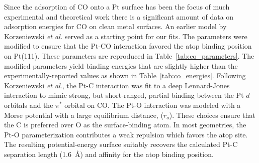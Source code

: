 Since the adsorption of CO onto a Pt surface has been the focus
of much experimental \citep{Yeo:1997th, Hopster:1978yf, Ertl:1977cg, Kelemen:1979ad}
and theoretical work
\citep{Beurden:2002ys, Korzeniewski:1986kl, Deshlahra:2009wu, Feibelman:2001qa, Mason:2004ix}
there is a significant amount of data on adsorption energies for CO on
clean metal surfaces. An earlier model by Korzeniewski {\it et
  al.}\citep{Korzeniewski:1986kl} served as a starting point for our fits. The parameters were
modified to ensure that the Pt-CO interaction favored the atop binding
position on Pt(111). These parameters are reproduced in Table~\ref{tab:co_parameters}.
The modified parameters yield binding energies that are slightly higher
than the experimentally-reported values as shown in Table~\ref{tab:co_energies}. Following Korzeniewski
{\it et al}.,\citep{Korzeniewski:1986kl} the Pt-C interaction was fit to a deep
Lennard-Jones interaction to mimic strong, but short-ranged, partial
binding between the Pt $d$ orbitals and the $\pi^*$ orbital on CO. The
Pt-O interaction was modeled with a Morse potential with a large
equilibrium distance, ($r_o$).  These choices ensure that the C is preferred
over O as the surface-binding atom. In most geometries, the Pt-O parameterization contributes a weak
repulsion which favors the atop site.  The resulting potential-energy
surface suitably recovers the calculated Pt-C separation length
(1.6~\AA)\citep{Beurden:2002ys} and affinity for the atop binding
position.\citep{Deshlahra:2012aa, Hopster:1978yf}

